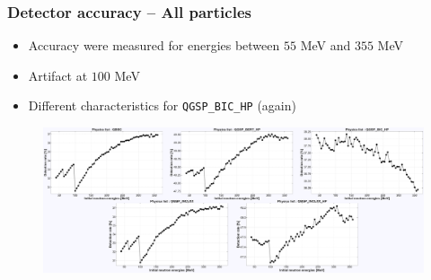 \begin{frame}
\frametitle{Detector accuracy -- All particles}

\begin{block}{}
	\begin{itemize}
		\item Accuracy were measured for energies between $55$ MeV and $355$ MeV
		\item Artifact at $100$ MeV
		\item Different characteristics for \texttt{QGSP\_BIC\_HP} (again)
	\end{itemize}
\end{block}

\begin{figure}
	\includegraphics[width=\textwidth]{images/detection_rates.pdf}
\end{figure}


\end{frame}